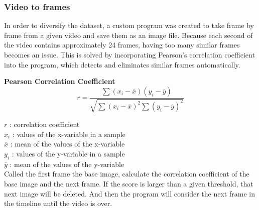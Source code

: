 \subsubsection{Video to frames}
    In order to diversify the dataset, a custom program was created to take frame by frame from a given video and save them as an image file. 
    Because each second of the video contains approximately 24 frames, having too many similar frames becomes an issue.
    This is solved by incorporating Pearson's correlation coefficient into the program, which detects and eliminates similar frames automatically.
    \begin{center}
        \textbf{Pearson Correlation Coefficient}\cite{freedman2007statistics}
        \begin{equation*}
            r = \frac{\sum (x_{i}-\overline{x})(y_{i}-\overline{y})}{\sqrt{\sum (x_{i}-\overline{x})^2\sum (y_{i}-\overline{y})^2}}
        \end{equation*}
    \end{center}
        $r$	:	correlation coefficient\\
        $x_{i}$	:	values of the x-variable in a sample\\
        $\bar{x}$	:	mean of the values of the x-variable\\
        $y_{i}$	:	values of the y-variable in a sample\\
        $\bar{y}$	:	mean of the values of the y-variable\\
    Called the first frame the base image, calculate the correlation coefficient of the base image and the next frame. 
    If the score is larger than a given threshold, that next image will be deleted. And then the program will consider the next frame in the timeline until the video is over.
    